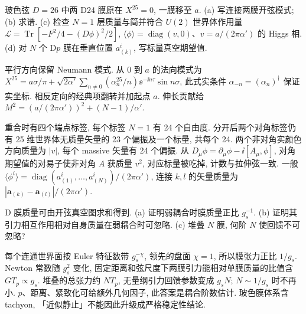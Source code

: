 \begin{exercise}
玻色弦 $D=26$ 中两 D24 膜原在 $X^{25}=0$, 一膜移至 $a$.
(a) 写连接两膜开弦模式; (b) 求谱.
(c) 检查 $N=1$ 层质量与简并符合 $U(2)$ 世界体作用量 $\mathcal L=\operatorname{Tr}[-F^2/4-(D\phi)^2/2]$, $\langle\phi\rangle=\operatorname{diag}(v,0)$、$v=a/(2\pi\alpha')$ 的 Higgs 相.
(d) 对 $N$ 个 D$p$ 膜在垂直位置 $a_{(k)}^i$, 写标量真空期望值.
\end{exercise}
\begin{solution}
平行方向保留 Neumann 模式. 从 0 到 $a$ 的法向模式为 $X^{25}=a\sigma/\pi+\sqrt{2\alpha'}\sum_{n\ne0}(\alpha_n^{25}/n)\ee^{-\ii n\tau}\sin n\sigma$, 此式实条件 $\alpha_{-n}=(\alpha_n)^\dagger$ 保证实坐标. 相反定向的经典项翻转并加起点 $a$. 伸长贡献给 $M^2=(a/(2\pi\alpha'))^2+(N-1)/\alpha'$.

重合时有四个端点标签, 每个标签 $N=1$ 有 24 个自由度. 分开后两个对角标签仍有 25 维世界体无质量矢量的 23 个偏振及一个标量, 共每个 24. 两个非对角实颜色方向质量为 $|v|$, 每个 massive 矢量有 24 个偏振. 从 $D_\mu\phi=\partial_\mu\phi-\ii[A_\mu,\phi]$, 对角期望值的对易子使非对角 $A$ 获质量 $v^2$, 对应标量被吃掉, 计数与拉伸弦一致. 一般 $\langle\phi^i\rangle=\operatorname{diag}(a_{(1)}^i,\ldots,a_{(N)}^i)/(2\pi\alpha')$, 连接 $k,l$ 的矢量质量为 $|\boldsymbol a_{(k)}-\boldsymbol a_{(l)}|/(2\pi\alpha')$.
\end{solution}

\begin{exercise}
D 膜质量可由开弦真空图求和得到.
(a) 证明弱耦合时膜质量正比 $g_s^{-1}$.
(b) 证明其引力相互作用相对自身质量在弱耦合时可忽略.
(c) 堆叠 $N$ 膜, 何阶 $N$ 使回馈不可忽略?
\end{exercise}
\begin{solution}
每个连通世界面按 Euler 特征数带 $g_s^{-\chi}$, 领先的盘面 $\chi=1$, 所以膜张力正比 $1/g_s$. Newton 常数随 $g_s^2$ 变化, 固定距离和弦尺度下两膜引力能相对单膜质量的比值含 $G T_p\propto g_s$. 堆叠的总张力约 $NT_p$, 无量纲引力回馈参数变成 $g_sN$; $N\sim1/g_s$ 时不再小. $p$、距离、紧致化可给额外几何因子, 此答案是耦合阶数估计. 玻色膜体系含 tachyon, 「近似静止」不能因此升级成严格稳定性结论.
\end{solution}
